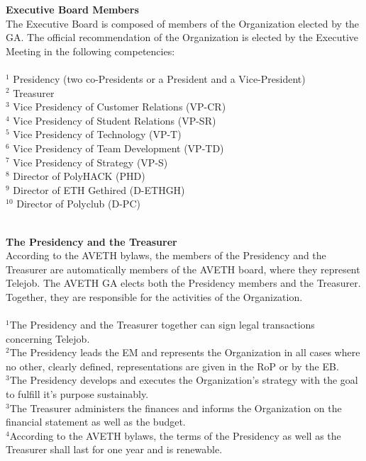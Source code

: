 \documentclass[10pt]{article}
\newcounter{qcounter}
\begin{document}
\begin{list}{{\bf Article :~}}{}
\item {\bf Executive Board Members}\\
The Executive Board is composed of members of the Organization elected by the GA. The official recommendation of the Organization is elected by the Executive Meeting in the following competencies:\\ \\
$^{1}$ Presidency (two co-Presidents or a President and a Vice-President)\\
$^{2}$ Treasurer\\
$^{3}$ Vice Presidency of Customer Relations (VP-CR)\\
$^{4}$ Vice Presidency of Student Relations (VP-SR)\\
$^{5}$ Vice Presidency of Technology (VP-T)\\
$^{6}$ Vice Presidency of Team Development (VP-TD)\\
$^{7}$ Vice Presidency of Strategy (VP-S)\\
$^{8}$ Director of PolyHACK (PHD)\\
$^{9}$ Director of ETH Gethired (D-ETHGH)\\
$^{10}$ Director of Polyclub (D-PC)\\\\

\item {\bf The Presidency and the Treasurer}\label{P&T}\\
According to the AVETH bylaws, the members of the Presidency and the Treasurer are automatically members of the AVETH board, where they represent Telejob. The AVETH GA elects both the Presidency members and the Treasurer. Together, they are responsible for the activities of the Organization. \\\\
$^{1}$The Presidency and the Treasurer together can sign legal transactions concerning Telejob.\\
$^{2}$The Presidency leads the EM and represents the Organization in all cases where no other, clearly defined, representations are given in the RoP or by the EB. \\
$^{3}$The Presidency develops and executes the Organization's strategy with the goal to fulfill it's purpose sustainably.\\
$^{3}$The Treasurer administers the finances and informs the Organization on the financial statement as well as the budget.\\
$^{4}$According to the AVETH bylaws, the terms of the Presidency as well as the Treasurer shall last for one year and is renewable.


\end{list}
\end{document}
